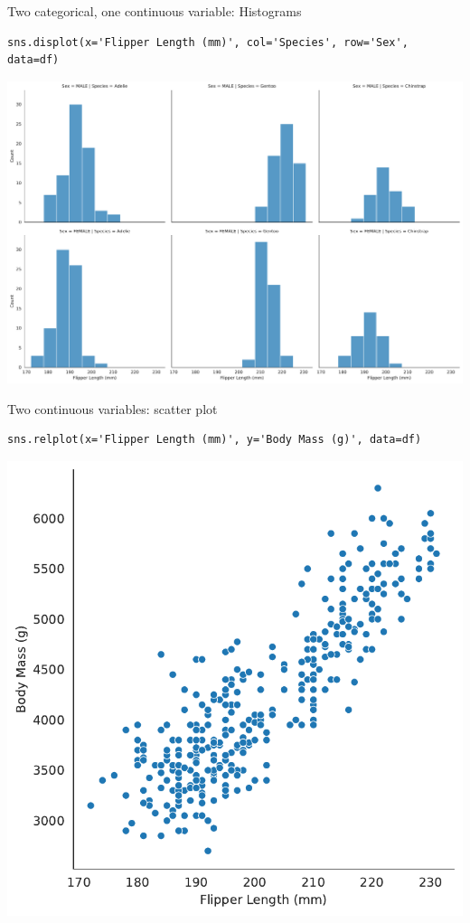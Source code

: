 \documentclass[aspectratio=169,usenames,dvipsnames]{beamer}
\begin{document}
\begin{frame}[fragile]{Two categorical, one continuous variable: Histograms}
\begin{lstlisting}
sns.displot(x='Flipper Length (mm)', col='Species', row='Sex', data=df)
\end{lstlisting}

\includegraphics[height=0.75\textheight]{fig/histplotpenguins2}
\end{frame}


\begin{frame}[fragile]{Two continuous variables: scatter plot}
\begin{lstlisting}
sns.relplot(x='Flipper Length (mm)', y='Body Mass (g)', data=df)
\end{lstlisting}

\includegraphics[height=0.7\textheight]{fig/scatterpenguins}
\end{frame}
\end{document}
